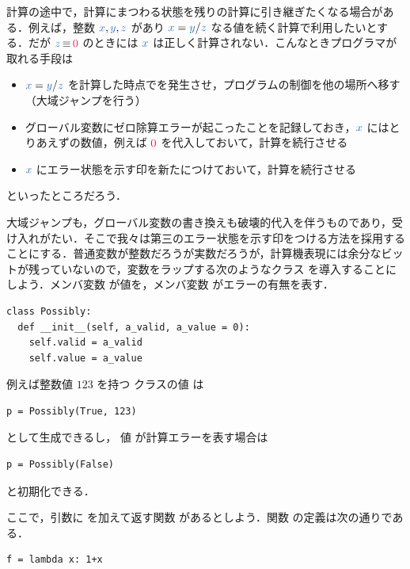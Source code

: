 \documentclass[a5paper,twoside,fleqn,draft]{jsbook}
\begin{document}
計算の途中で，計算にまつわる状態を残りの計算に引き継ぎたくなる場合がある．例えば，整数 $\hVar{x},\hVar{y},\hVar{z}$ があり $\hVar{x}=\hVar{y}/\hVar{z}$ なる値を続く計算で利用したいとする．だが $\hVar{z}\hIfEq\hConstant{0}$ のときには $\hVar{x}$ は正しく計算されない．こんなときプログラマが取れる手段は
\begin{itemize}
\item $\hVar{x}=\hVar{y}/\hVar{z}$ を計算した時点でを発生させ，プログラムの制御を他の場所へ移す（大域ジャンプを行う）
\item グローバル変数にゼロ除算エラーが起こったことを記録しておき，$\hVar{x}$ にはとりあえずの数値，例えば $\hConstant{0}$ を代入しておいて，計算を続行させる
\item $\hVar{x}$ にエラー状態を示す印を新たにつけておいて，計算を続行させる
\end{itemize}
といったところだろう．

大域ジャンプも，グローバル変数の書き換えも破壊的代入を伴うものであり，受け入れがたい．そこで我々は第三のエラー状態を示す印をつける方法を採用することにする．普通変数が整数だろうが実数だろうが，計算機表現には余分なビットが残っていないので，変数をラップする次のようなクラス  を導入することにしよう．メンバ変数  が値を，メンバ変数  がエラーの有無を表す．
\begin{pythoncode}
\begin{verbatim}
class Possibly:
  def __init__(self, a_valid, a_value = 0):
    self.valid = a_valid
    self.value = a_value
\end{verbatim}
\end{pythoncode}

例えば整数値 $123$ を持つ  クラスの値  は
\begin{pythoncode}
\begin{verbatim}
p = Possibly(True, 123)
\end{verbatim}
\end{pythoncode}
として生成できるし， 値  が計算エラーを表す場合は
\begin{pythoncode}
\begin{verbatim}
p = Possibly(False)
\end{verbatim}
\end{pythoncode}
と初期化できる．

ここで，引数に  を加えて返す関数  があるとしよう．関数  の定義は次の通りである．
\begin{pythoncode}
\begin{verbatim}
f = lambda x: 1+x
\end{verbatim}
\end{pythoncode}
\end{document}
